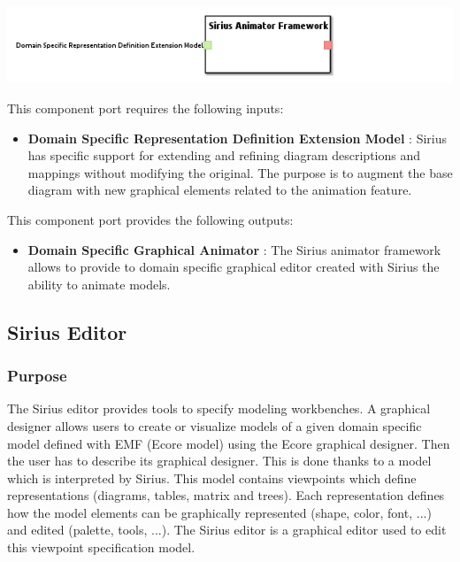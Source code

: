\documentclass{gemoc} %
\begin{document}
\begin{center}
\includegraphics*[trim=0.0cm 0.0cm 0cm 0.0cm, clip=true]{../images/generated/Generated_Sirius_Animator_Framework.png}
\end{center}

This component port requires the following inputs:
\begin{itemize}
  \item \textbf{Domain Specific Representation Definition Extension Model} :
Sirius has specific support for extending and refining diagram descriptions and mappings without modifying the original. The purpose is to augment the base diagram with new graphical elements related to the animation feature.
\end{itemize}

This component port provides the following outputs:
\begin{itemize}
  \item \textbf{Domain Specific Graphical Animator} :
The Sirius animator framework allows to provide to domain specific graphical editor created with Sirius the ability to animate models.
\end{itemize}


\subsection{Sirius Editor}

\subsubsection{Purpose}
The Sirius editor provides tools to specify modeling workbenches. A graphical designer allows users to create or visualize models of a given domain specific model defined with EMF (Ecore model) using the Ecore graphical designer. Then the user has to describe its graphical designer. This is done thanks to a model which is interpreted by Sirius. This model contains viewpoints which define representations (diagrams, tables, matrix and trees). Each representation defines how the model elements can be graphically represented (shape, color, font, ...) and edited (palette, tools, ...).
The Sirius editor is a graphical editor used to edit this viewpoint specification model.
\end{document}

